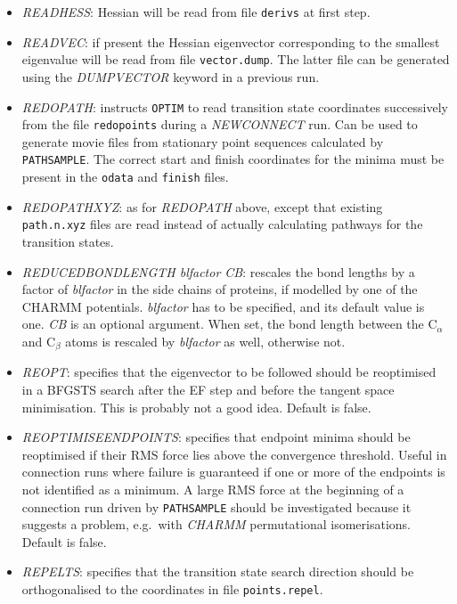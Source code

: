 \documentclass[12pt,a4paper,dvips]{article}
\begin{document}
\begin{itemize}
\item {\it READHESS\/}: Hessian will be read from file {\tt derivs} at first step.

\item {\it READVEC\/}: if present the Hessian eigenvector
corresponding to the smallest eigenvalue 
will be read from file {\tt vector.dump}. The latter file can be generated using the
{\it DUMPVECTOR\/} keyword in a previous run.

\item {\it REDOPATH\/}: instructs {\tt OPTIM} to read transition state coordinates
successively from the file {\tt redopoints} during a {\it NEWCONNECT\/} run.
Can be used to generate movie files from stationary point sequences calculated
by {\tt PATHSAMPLE}. The correct start and finish coordinates for the minima
must be present in the {\tt odata} and {\tt finish} files.

\item {\it REDOPATHXYZ\/}: as for {\it REDOPATH\/} above, except that existing
{\tt path.n.xyz\/} files are read instead of actually calculating pathways for the
transition states.

\item {\it REDUCEDBONDLENGTH blfactor CB\/}: rescales the bond lengths by a factor
of {\it blfactor} in the side chains of proteins, if modelled by one of the CHARMM
potentials. {\it blfactor} has to be specified, and its default value is one.
{\it CB} is an optional argument. When set, the bond length between the C$_{\alpha}$
and C$_{\beta}$ atoms is rescaled by {\it blfactor} as well, otherwise not.

\item {\it REOPT\/}: specifies that the eigenvector to be followed should be reoptimised
      in a BFGSTS search after the EF step and before the tangent space minimisation.
This is probably not a good idea. Default is false.

\item {\it REOPTIMISEENDPOINTS\/}: specifies that endpoint minima should be reoptimised
if their RMS force lies above the convergence threshold. Useful in connection 
runs where failure is guaranteed if one or more of the endpoints is not identified
as a minimum. A large RMS force at the beginning of a connection run driven
by {\tt PATHSAMPLE} should be investigated because it suggests a problem, e.g.~with
{\it CHARMM\/} permutational isomerisations.
Default is false.

\item {\it REPELTS\/}: specifies that the transition state search direction should
be orthogonalised to the coordinates in file {\tt points.repel}.


\end{itemize}
\end{document}
